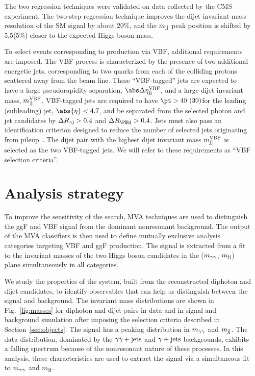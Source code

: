 \documentclass[11pt,twoside,a4paper,cmspaper,final,collab]{cms-tdr}
\begin{document}
The two regression techniques were validated on data collected by the CMS experiment.
The two-step regression technique improves the dijet invariant mass resolution of the SM \HH signal by about 20\%, and the $m_\text{jj}$ peak position is shifted by 5.5\GeV (5\%) closer to the expected Higgs boson mass.


To select events corresponding to \HH production via VBF, additional requirements are imposed. The VBF
process is characterized by the presence of two additional energetic jets, corresponding to two quarks from each of the colliding protons scattered away from the beam line. These ``VBF-tagged'' jets are expected to have a large pseudorapidity separation, $\dEtavbf$, and a large dijet invariant mass, $m^{\mathrm{VBF}}_\text{jj}$.  VBF-tagged jets are required to have $\pt > 40~(30)$\GeV for the leading (subleading) jet, $\abs{\eta} < 4.7$, and be separated from the selected photon and {\cPqb} jet candidates by $\Delta R_{\gamma \text{j}} > 0.4$ and $\DRbj > 0.4$. Jets must also pass an identification criterion designed to reduce the number of selected jets originating from pileup~\cite{PUJID}. The dijet pair with the highest dijet invariant mass $m^{\mathrm{VBF}}_\text{jj}$ is selected as the two VBF-tagged jets. We will refer to these requirements as ``VBF selection criteria''.
 

\section{Analysis strategy}
\label{sec:hhsystem}
To improve the sensitivity of the search, MVA techniques are used to distinguish the ggF and VBF \HH signal from the dominant nonresonant background. The output of the MVA classifiers is then used to define mutually exclusive analysis categories targeting VBF and ggF \HH production. 
 The \HH signal is extracted from a fit to the 
invariant masses of the two Higgs boson candidates in the ($m_{\gamma\gamma}$, $m_\text{jj}$) plane simultaneously in all categories.
 
We study the properties of the \HH system, built from the reconstructed diphoton and dijet candidates, to identify observables that can help us distinguish between the signal and background. The invariant mass distributions are shown in Fig.~\ref{fig:masses} for diphoton and dijet pairs in data and in signal and background simulation after imposing the selection criteria described in Section~\ref{sec:objects}. 
The signal has a peaking distribution in $m_{\gamma\gamma}$ and $m_\text{jj}$. The data distribution, dominated by the $\gamma\gamma+\text{jets}$ and $\gamma+\text{jets}$ backgrounds, exhibits a falling spectrum because of the nonresonant nature of these processes.
In this analysis, these characteristics are used to extract the signal via a simultaneous fit to $m_{\gamma\gamma}$ and $m_\text{jj}$.
\end{document}
